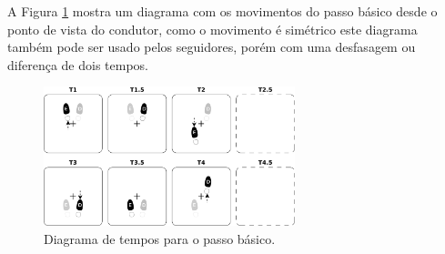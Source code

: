 A Figura \ref{fig:histbaselineal} mostra um diagrama com os movimentos do passo básico
desde o ponto de vista do condutor, 
como o movimento é simétrico este diagrama também pode ser usado pelos seguidores,
porém com uma desfasagem ou diferença de dois tempos.


\begin{figure}[!h]
  \centering
    \includegraphics[width=0.65\textwidth]{chapters/cap-historia-passos/basico.eps}
  \caption{Diagrama de tempos para o passo básico.}
  \label{fig:histbaselineal}
\end{figure}





